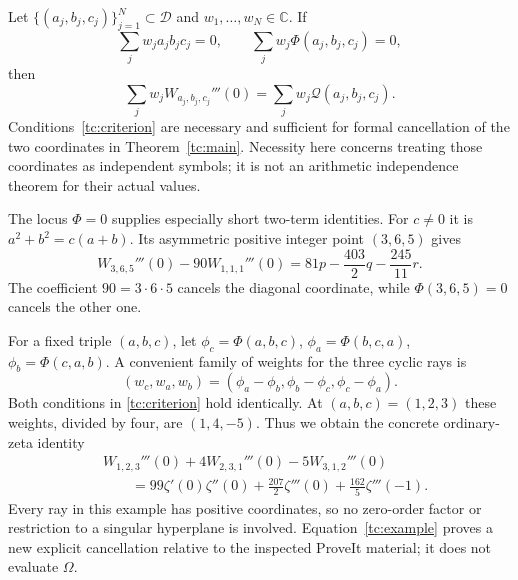 \begin{corollary}
\label{tc:cancellation}
Let $\{(a_j,b_j,c_j)\}_{j=1}^N\subset\mathscr D$ and
$w_1,\ldots,w_N\in\mathbb C$.  If
\begin{equation}
 \sum_jw_j a_jb_jc_j=0,\qquad
 \sum_jw_j\Phi(a_j,b_j,c_j)=0,
 \label{tc:criterion}
\end{equation}
then
\begin{equation}
 \sum_jw_jW_{a_j,b_j,c_j}'''(0)
       =\sum_jw_j\mathscr Q(a_j,b_j,c_j).
 \label{tc:cancelled}
\end{equation}
Conditions~\eqref{tc:criterion} are necessary and sufficient for
formal cancellation of the two coordinates in
Theorem~\ref{tc:main}.  Necessity here concerns treating those
coordinates as independent symbols; it is not an arithmetic
independence theorem for their actual values.
\end{corollary}

The locus $\Phi=0$ supplies especially short two-term identities.
For $c\ne0$ it is $a^2+b^2=c(a+b)$.  Its asymmetric positive
integer point $(3,6,5)$ gives
\begin{equation}
 \boxed{\displaystyle
 W_{3,6,5}'''(0)-90W_{1,1,1}'''(0)
   =81p-\frac{403}{2}q-\frac{245}{11}r.}
 \label{tc:two-ray-example}
\end{equation}
The coefficient $90=3\cdot6\cdot5$ cancels the diagonal
coordinate, while $\Phi(3,6,5)=0$ cancels the other one.

For a fixed triple $(a,b,c)$, let
$\phi_c=\Phi(a,b,c)$, $\phi_a=\Phi(b,c,a)$,
$\phi_b=\Phi(c,a,b)$.  A convenient family of weights for the three
cyclic rays is
\[
 (w_c,w_a,w_b)=(\phi_a-\phi_b,\phi_b-\phi_c,\phi_c-\phi_a).
\]
Both conditions in \eqref{tc:criterion} hold identically.
At $(a,b,c)=(1,2,3)$ these weights, divided by four, are $(1,4,-5)$.
Thus we obtain the concrete ordinary-zeta identity
\begin{equation}
 \boxed{\begin{aligned}
 &W_{1,2,3}'''(0)+4W_{2,3,1}'''(0)-5W_{3,1,2}'''(0)\\
 &\qquad=99\zeta'(0)\zeta''(0)
       +\frac{207}{2}\zeta'''(0)
       +\frac{162}{5}\zeta'''(-1).
 \end{aligned}}
 \label{tc:example}
\end{equation}
Every ray in this example has positive coordinates, so no zero-order
factor or restriction to a singular hyperplane is involved.
Equation~\eqref{tc:example} proves a new explicit cancellation relative
to the inspected ProveIt material; it does not evaluate $\Omega$.

